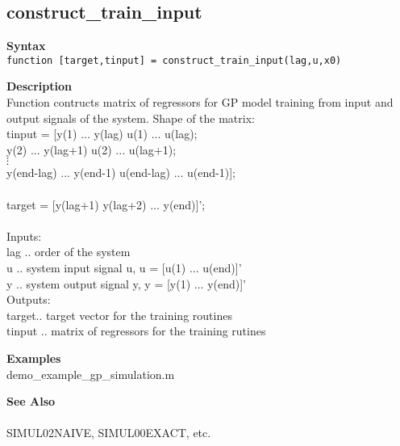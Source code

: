 \subsection*{construct\_train\_input} \label{fun:construct_train_input}


\textbf{Syntax}
\\ \texttt{function [target,tinput] = construct\_train\_input(lag,u,x0)}

\textbf{Description}
\\ Function contructs matrix of regressors for GP model training from input and
\\ output signals of the system. Shape of the matrix:
\\ tinput = [y(1)      ... y(lag)   u(1)       ... u(lag);
\\          y(2)       ... y(lag+1) u(2)       ... u(lag+1);
\\    $\vdots$
\\          y(end-lag) ... y(end-1) u(end-lag) ... u(end-1)];
\\
\\ target = [y(lag+1) y(lag+2) ... y(end)]';
\\
\\ Inputs:
\\ lag .. order of the system
\\ u .. system input signal u, u = [u(1) ... u(end)]'
\\ y .. system output signal y, y = [y(1) ... y(end)]'
\\ Outputs:
\\ target.. target vector for the training routines
\\ tinput .. matrix of regressors for the training rutines

\textbf{Examples}
\\ demo\_example\_gp\_simulation.m

\textbf{See Also}
\\
\\ SIMUL02NAIVE, SIMUL00EXACT, etc.
